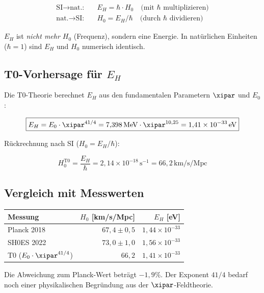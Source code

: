 \begin{align}
\text{SI} \to \text{nat.:} \quad & E_H = \hbar \cdot H_0 
\quad\text{(mit $\hbar$ multiplizieren)} \\
\text{nat.} \to \text{SI:} \quad & H_0 = E_H / \hbar
\quad\text{(durch $\hbar$ dividieren)}
\end{align}

$E_H$ ist \emph{nicht mehr $H_0$} (Frequenz), sondern eine Energie. 
In natürlichen Einheiten ($\hbar = 1$) sind $E_H$ und $H_0$ 
numerisch identisch.

\subsection{T0-Vorhersage für $E_H$}

Die T0-Theorie berechnet $E_H$ aus den fundamentalen Parametern 
$\xipar$ und $E_0$:

\begin{equation}
\boxed{E_H = E_0 \cdot \xipar^{41/4} = 7{,}398\,\text{MeV} \cdot \xipar^{10{,}25} = 1{,}41 \times 10^{-33}\,\text{eV}}
\label{eq:E_H_T0}
\end{equation}

Rückrechnung nach SI ($H_0 = E_H / \hbar$):

\begin{equation}
H_0^{\text{T0}} = \frac{E_H}{\hbar} = 2{,}14 \times 10^{-18}\,\text{s}^{-1} = 66{,}2\,\text{km/s/Mpc}
\end{equation}

\subsection{Vergleich mit Messwerten}

\begin{center}
\begin{tabular}{lrr}
\toprule
Messung & $H_0$ [km/s/Mpc] & $E_H$ [eV] \\
\midrule
Planck 2018 & $67{,}4 \pm 0{,}5$ & $1{,}44 \times 10^{-33}$ \\
SH0ES 2022 & $73{,}0 \pm 1{,}0$ & $1{,}56 \times 10^{-33}$ \\
T0 ($E_0 \cdot \xipar^{41/4}$) & $66{,}2$ & $1{,}41 \times 10^{-33}$ \\
\bottomrule
\end{tabular}
\end{center}

Die Abweichung zum Planck-Wert beträgt $-1{,}9\%$. Der Exponent $41/4$ 
bedarf noch einer physikalischen Begründung aus der $\xipar$-Feldtheorie.

